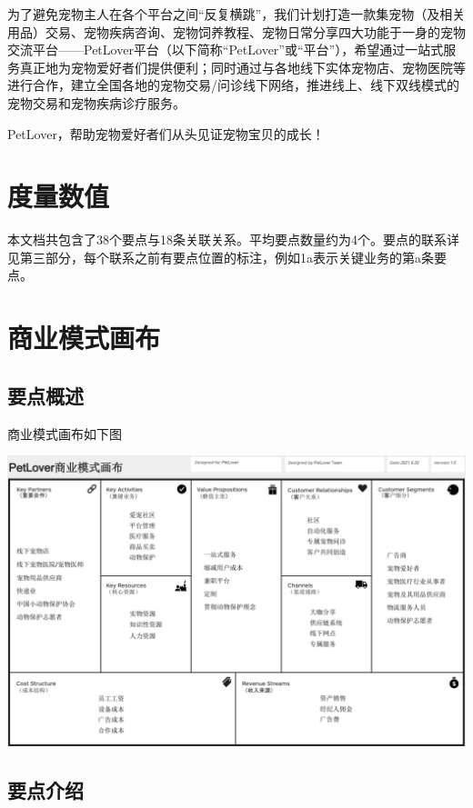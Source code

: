 \documentclass[a4paper]{ctexart}
\begin{document}
为了避免宠物主人在各个平台之间“反复横跳”，我们计划打造一款集宠物（及相关用品）交易、宠物疾病咨询、宠物饲养教程、宠物日常分享四大功能于一身的宠物交流平台——PetLover平台（以下简称“PetLover”或“平台”），希望通过一站式服务真正地为宠物爱好者们提供便利；同时通过与各地线下实体宠物店、宠物医院等进行合作，建立全国各地的宠物交易/问诊线下网络，推进线上、线下双线模式的宠物交易和宠物疾病诊疗服务。

PetLover，帮助宠物爱好者们从头见证宠物宝贝的成长！


\section{度量数值}

本文档共包含了38个要点与18条关联关系。平均要点数量约为4个。要点的联系详见第三部分，每个联系之前有要点位置的标注，例如1a表示关键业务的第a条要点。

\section{商业模式画布}

\subsection{要点概述}

商业模式画布如下图

\begin{center}
  \includegraphics[width=16cm]{the-business-model-canvas}
\end{center}

\subsection{要点介绍}
\end{document}
